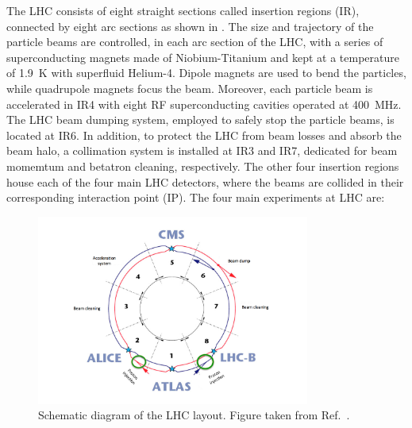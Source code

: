 The LHC consists of eight straight sections called insertion regions (IR), connected by eight arc sections as shown in . The size and trajectory of the particle beams are controlled, in each arc section of the LHC, with a series of superconducting magnets made of Niobium-Titanium and kept at a temperature of \SI{1.9}{\K} with superfluid Helium-4. Dipole magnets are used to bend the particles, while quadrupole magnets focus the beam. Moreover, each particle beam is accelerated in IR4 with eight RF superconducting cavities operated at \SI{400}{\MHz}. The LHC beam dumping system, employed to safely stop the particle beams, is located at IR6. In addition, to protect the LHC from beam losses and absorb the beam halo, a collimation system is installed at IR3 and IR7, dedicated for beam momemtum and betatron cleaning, respectively. The other four insertion regions house each of the four main LHC detectors, where the beams are collided in their corresponding interaction point (IP). The four main experiments at LHC are:

\begin{figure}[!htbp]
 \begin{center}
  \includegraphics[width=0.8\textwidth]{Figures/Experiment/LHC/LHCLayout.png}
 \end{center}
 \caption{Schematic diagram of the LHC layout. Figure taken from Ref.~\cite{LHCLayoutImage}.}
 \label{fig:LHCLayout}
\end{figure}

